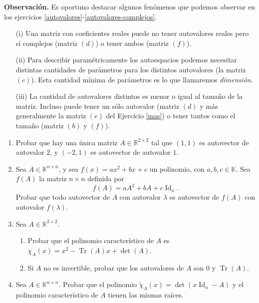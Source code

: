 \documentclass[a4paper,12pt,twoside,spanish,reqno]{amsbook}
\numberwithin{equation}{section}
\begin{document}
\textbf{Observación.} Es oportuno destacar algunos fenómenos que podemos observar en los ejercicios \ref{autovalores}-\ref{autovalores-complejos}.
\begin{itemize}
 \item[(i)] Una matriz con coeficientes reales puede no tener autovalores reales pero sí complejos (matriz $(d)$) o tener ambos (matriz $(f)$).
 \item[(ii)] Para describir paramétricamente los autoespacios podemos necesitar distintas cantidades de parámetros para los distintos autovalores (la matriz $(c)$). Esta cantidad mínima de parámetros es lo que llamaremos {\it dimensión}.
 \item[(iii)] La cantidad de autovalores distintos es menor o igual al tama\~no de la matriz. Incluso puede tener un sólo autovalor (matriz $(d)$ y más generalmente la matriz $(e)$ del Ejercicio \ref{mas}) o tener tantos como el tama\~no (matriz $(b)$ y $(f)$).
\end{itemize}

\begin{enumerate}[resume,topsep=6pt,itemsep=.4cm]

\item Probar que hay una única matriz $A\in\mathbb{R}^{2\times 2}$ tal que $(1,1)$ es autovector de autovalor $2$, y $(-2,1)$ es autovector de autovalor $1$.
    

\item Sea $A\in\mathbb{K}^{n\times n}$, y sea $f(x) = ax^2+bx+c$ un polinomio, con $a,b,c\in\mathbb{K}$. Sea $f(A)$ la matriz $n \times n$ definida por
$$f(A) = a A^2+bA+c\operatorname{Id}_n.$$
Probar que todo autovector de $A$ con autovalor $\lambda$ es autovector de $f(A)$ con autovalor $f(\lambda)$.

	
\item Sea $A\in\mathbb{K}^{2\times 2}$.

	\begin{enumerate} 	
		\item Probar que el polinomio característico de $A$ es \ $\chi_A(x) = x^2-\operatorname{Tr}(A)x+\det(A)$.
		\item Si $A$ no es invertible, probar que los autovalores de  $A$ son $0$ y $\operatorname{Tr}(A)$.
	\end{enumerate}

\item Sea $A\in\mathbb{K}^{n\times n}$. Probar que el polinomio $\tilde\chi_A(x)=\det(x\operatorname{Id}_n-A)$ y el polinomio característico de $A$ tienen las mismas raíces.

\end{enumerate}
\end{document}
